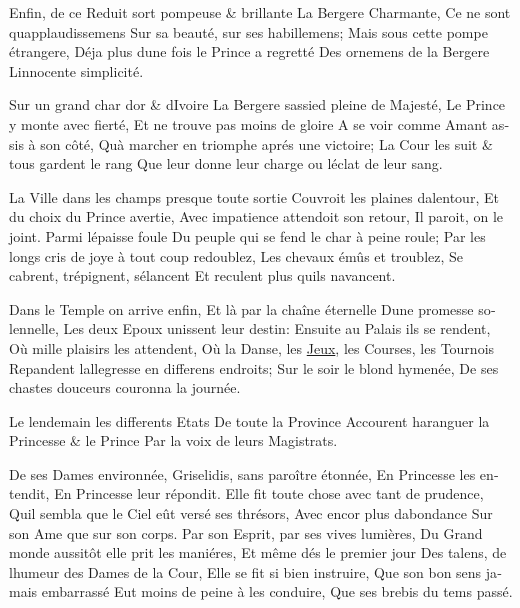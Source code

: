 \documentclass[14pt,a4paper]{memoir}
\newcommand{\ul}[1]{\uline{#1}}
\begin{document}
{{\begin{otherlanguage}{french}
{Enfin, de ce Reduit sort pompeuse \& brillante } {La Bergere
Charmante,} {Ce ne sont qu\textquotesingle applaudissemens} {Sur sa
beauté, sur ses habillemens;} {Mais sous cette pompe étrangere,} {Déja
plus d\textquotesingle une fois le Prince a regretté} {Des ornemens de
la Bergere} {L\textquotesingle innocente simplicité.}

{Sur un grand char d\textquotesingle or \& d\textquotesingle Ivoire} {La
Bergere s\textquotesingle assied pleine de Majesté,} {Le Prince y monte
avec fierté,} {Et ne trouve pas moins de gloire} {A se voir comme Amant
assis à son côté,} {Qu\textquotesingle à marcher en triomphe aprés une
victoire;} {La Cour les suit \& tous gardent le rang} {Que leur donne
leur charge ou l\textquotesingle éclat de leur sang.}

{La Ville dans les champs presque toute sortie} {Couvroit les plaines
d\textquotesingle alentour,} {Et du choix du Prince avertie,} {Avec
impatience attendoit son retour,} {Il paroit, on le joint. Parmi
l\textquotesingle épaisse foule} {Du peuple qui se fend le char à peine
roule;} {Par les longs cris de joye à tout coup redoublez, } {Les
chevaux émûs et troublez,} {Se cabrent, trépignent,
s\textquotesingle élancent} {Et reculent plus qu\textquotesingle ils
n\textquotesingle avancent.}

{Dans le Temple on arrive enfin,} {Et là par la chaîne éternelle}
{D\textquotesingle une promesse solennelle,} {Les deux Epoux unissent
leur destin:} {Ensuite au Palais ils se rendent,} {Où mille plaisirs les
attendent,} {Où la Danse, les \ul{Jeux}, les Courses, les Tournois}
{Repandent l\textquotesingle allegresse en differens endroits;} {Sur le
soir le blond hymenée,} {De ses chastes douceurs couronna la journée.}

{Le lendemain les differents Etats} {De toute la Province} {Accourent
haranguer la Princesse \& le Prince } {Par la voix de leurs Magistrats.}

{De ses Dames environnée,} {Griselidis, sans paroître étonnée,} {En
Princesse les entendit,} {En Princesse leur répondit.} {Elle fit toute
chose avec tant de prudence,} {Qu\textquotesingle il sembla que le Ciel
eût versé ses thrésors, } {Avec encor plus d\textquotesingle abondance}
{Sur son Ame que sur son corps.} {Par son Esprit, par ses vives
lumières,} {Du Grand monde aussitôt elle prit les maniéres, } {Et même
dés le premier jour} {Des talens, de l\textquotesingle humeur des Dames
de la Cour,} {Elle se fit si bien instruire,} {Que son bon sens jamais
embarrassé} {Eut moins de peine à les conduire,} {Que ses brebis du tems
passé.}


\end{otherlanguage}}}
\end{document}
